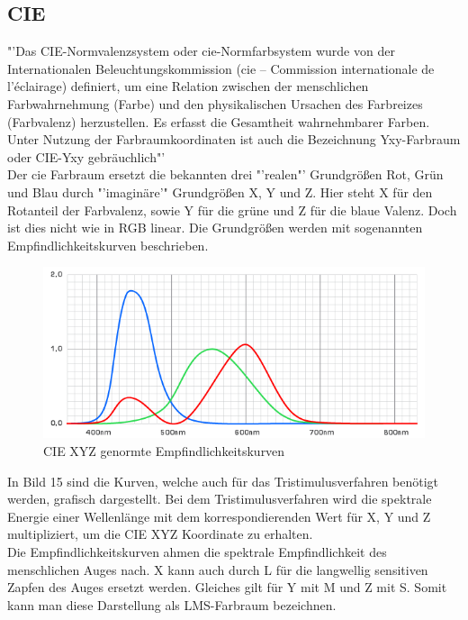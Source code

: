 \documentclass[11pt]{scrartcl}
\begin{document}
\subsection{CIE} \label{section_CIE}
"'Das CIE-Normvalenzsystem oder \ac{cie}-Normfarbsystem wurde von der Internationalen Beleuchtungskommission (\ac{cie} – Commission
internationale de l’éclairage) definiert, um eine Relation zwischen der menschlichen Farbwahrnehmung (Farbe) und den physikalischen
Ursachen des Farbreizes (Farbvalenz) herzustellen. Es erfasst die Gesamtheit wahrnehmbarer Farben. Unter Nutzung der Farbraumkoordinaten
ist auch die Bezeichnung Yxy-Farbraum oder CIE-Yxy gebräuchlich"'
\cite{wikipediaCIE}\\
Der \ac{cie} Farbraum ersetzt die bekannten drei "'realen"' Grundgrößen Rot, Grün und Blau durch "'imaginäre'" Grundgrößen X, Y und Z. Hier
steht X für den Rotanteil der Farbvalenz, sowie Y für die grüne und Z für die blaue Valenz. Doch ist dies nicht wie in RGB linear. Die
Grundgrößen werden mit sogenannten Empfindlichkeitskurven beschrieben.
\begin{figure}[H]
    \begin{center}
        \includegraphics[width=.75\textwidth]{images/cie_tristimul.png}
    \end{center}
    \caption[CIE XYZ genormte Empfindlichkeitskurven]{CIE XYZ genormte Empfindlichkeitskurven \cite{wikipediaCIE}}
\end{figure}
\noindent
In Bild 15 sind die Kurven, welche auch für das Tristimulusverfahren benötigt werden, grafisch dargestellt. Bei dem Tristimulusverfahren
wird die spektrale Energie einer Wellenlänge mit dem korrespondierenden Wert für X, Y und Z multipliziert, um die CIE XYZ Koordinate zu
erhalten.\\
Die Empfindlichkeitskurven ahmen die spektrale Empfindlichkeit des menschlichen Auges nach. X kann auch durch L für die langwellig
sensitiven Zapfen des Auges ersetzt werden. Gleiches gilt für Y mit M und Z mit S. Somit kann man diese Darstellung als LMS-Farbraum
bezeichnen.
\end{document}
